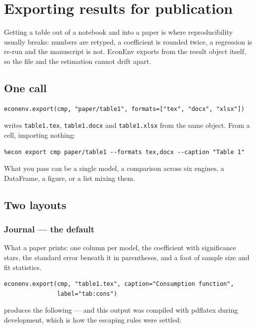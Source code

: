 \documentclass[11pt,a4paper]{report}
\begin{document}
\chapter{Exporting results for publication}

Getting a table out of a notebook and into a paper is where reproducibility
usually breaks: numbers are retyped, a coefficient is rounded twice, a
regression is re-run and the manuscript is not. EconEnv exports from the result
object itself, so the file and the estimation cannot drift apart.

\section{One call}

\begin{lstlisting}
econenv.export(cmp, "paper/table1", formats=["tex", "docx", "xlsx"])
\end{lstlisting}

writes \texttt{table1.tex}, \texttt{table1.docx} and \texttt{table1.xlsx} from
the same object. From a cell, importing nothing:

\begin{lstlisting}
%econ export cmp paper/table1 --formats tex,docx --caption "Table 1"
\end{lstlisting}

What you pass can be a single model, a comparison across six engines, a
DataFrame, a figure, or a list mixing them.

\section{Two layouts}

\subsection*{Journal --- the default}

What a paper prints: one column per model, the coefficient with significance
stars, the standard error beneath it in parentheses, and a foot of sample size
and fit statistics.

\begin{lstlisting}
econenv.export(cmp, "table1.tex", caption="Consumption function",
               label="tab:cons")
\end{lstlisting}

produces the following --- and this output was compiled with pdflatex during
development, which is how the escaping rules were settled:
\end{document}
